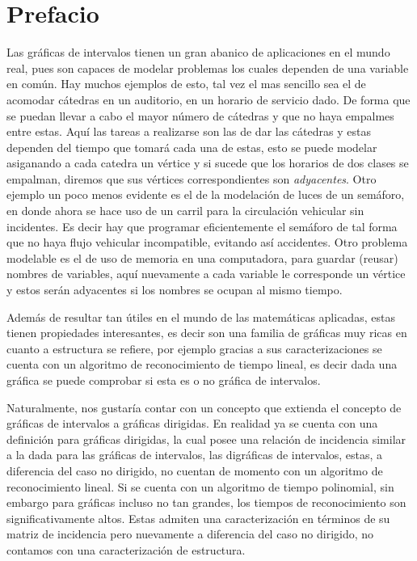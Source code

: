 \chapter*{Prefacio}
\label{sec:prfcio}

Las gráficas de intervalos tienen un gran abanico de aplicaciones en el mundo real, pues son capaces de modelar problemas los cuales dependen de una variable en común. Hay muchos ejemplos de esto, tal vez el mas sencillo sea el de acomodar cátedras en un auditorio, en un horario de servicio dado. De forma que se puedan llevar a cabo el mayor número de cátedras y que no haya empalmes entre estas. Aquí las tareas a realizarse son las de dar las cátedras y estas dependen del tiempo que tomará cada una de estas, esto se puede modelar asiganando a cada catedra un vértice y si sucede que los horarios de dos clases se empalman, diremos que sus vértices correspondientes son \textit{adyacentes}. Otro ejemplo un poco menos evidente es el de la modelación de luces de un semáforo, en donde ahora se hace uso de un carril para la circulación vehicular sin incidentes. Es decir hay que programar eficientemente el semáforo de tal forma que no haya flujo vehicular incompatible, evitando así accidentes. Otro problema modelable es el de uso de memoria en una computadora, para guardar (reusar) nombres de variables, aquí nuevamente a cada variable le corresponde un vértice y estos serán adyacentes si los nombres se ocupan al mismo tiempo.

Además de resultar tan útiles en el mundo de las matemáticas aplicadas, estas tienen propiedades interesantes, es decir son una familia de gráficas muy ricas en cuanto a estructura se refiere, por ejemplo gracias a sus caracterizaciones se cuenta con un algoritmo de reconocimiento de tiempo lineal, es decir dada una gráfica se puede comprobar si esta es o no gráfica de intervalos. 

Naturalmente, nos gustaría contar con un concepto que extienda el concepto de gráficas de intervalos a gráficas dirigidas.
En realidad ya se cuenta con una definición para gráficas dirigidas, la cual posee una relación de incidencia similar a la dada para las gráficas de intervalos, las digráficas de intervalos, estas, a diferencia del caso no dirigido, no cuentan de momento con un algoritmo de reconocimiento lineal. Si se cuenta con un algoritmo de tiempo polinomial, sin embargo para gráficas incluso no tan grandes, los tiempos de reconocimiento son significativamente altos. 
Estas admiten una caracterización en términos de su matriz de incidencia pero nuevamente a diferencia del caso no dirigido, no contamos con una caracterización de estructura.

